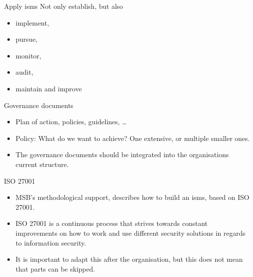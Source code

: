 \documentclass{beamer}
\begin{document}
\begin{frame}{Apply \ac{isms}}
  Not only establish, but also
  \begin{itemize}
    \item implement,
    \item pursue,
    \item monitor,
    \item audit,
    \item maintain and improve
  \end{itemize}
\end{frame}

\begin{frame}{Governance documents}
  \begin{itemize}
    \item Plan of action, policies, guidelines, \dots

    \item Policy: What do we want to achieve?
      One extensive, or multiple smaller ones.

    \item The governance documents should be integrated into the organisations
      current structure.

  \end{itemize}
\end{frame}

%

\begin{frame}{ISO 27001}
  \begin{itemize}
    \item MSB's methodological support, describes how to build an \ac{isms},
      based on ISO 27001.

    \item ISO 27001 is a continuous process that strives towards constant
      improvements on how to work and use different security solutions in
      regards to information security.

    \item It is important to adapt this after the organisation, but this does
      not mean that parts can be skipped.

  \end{itemize}
\end{frame}
\end{document}
